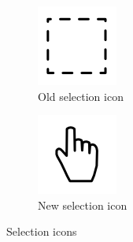 \begin{figure}[h]
	\begin{subfigure}[b]{0.45\textwidth}
		\centering
		\includegraphics[scale = 0.1]{media/selectOld}
		\caption{Old selection icon}
		\label{figure:old-select}
	\end{subfigure}	
	\qquad
	\begin{subfigure}[b]{0.45\textwidth}
		\centering
		\includegraphics[scale = 1]{media/selectNew}
		\caption{New selection icon}
		\label{figure:new-select}
	\end{subfigure}
	\caption{Selection icons}
	\label{figure:select}
\end{figure}